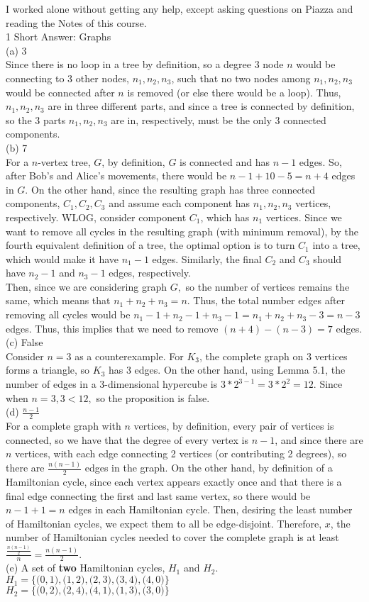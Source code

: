 \documentclass{article}
\begin{document}
I worked alone without getting any help, except asking questions on Piazza and reading the Notes of this course. \\[1cm]
{\Large 1 Short Answer: Graphs} \\[.5cm]
(a) 3 \\[.3cm]
\indent Since there is no loop in a tree by definition, so a degree 3 node $n$ would be connecting to 3 other nodes, $n_1, n_2, n_3$, such that no two nodes among $n_1, n_2, n_3$ would be connected after $n$ is removed (or else there would be a loop). Thus, $n_1, n_2, n_3$ are in three different parts, and since a tree is connected by definition, so the 3 parts $n_1, n_2, n_3$ are in, respectively, must be the only 3 connected components. \\[.5cm]
(b) 7 \\[.3cm]
\indent For a $n$-vertex tree, $G$, by definition, $G$ is connected and has $n - 1$ edges. So, after Bob's and Alice's movements, there would be $n - 1 + 10 - 5 = n + 4$ edges in $G.$ On the other hand, since the resulting graph has three connected components, $C_1, C_2, C_3$ and assume each component has $n_1, n_2, n_3$ vertices, respectively. WLOG, consider component $C_1$, which has $n_1$ vertices. Since we want to remove all cycles in the resulting graph (with minimum removal), by the fourth equivalent definition of a tree, the optimal option is to turn $C_1$ into a tree, which would make it have $n_1 - 1$ edges. Similarly, the final $C_2$ and $C_3$ should have $n_2 - 1$ and $n_3 - 1$ edges, respectively. \\[.3cm]
\indent Then, since we are considering graph $G,$ so the number of vertices remains the same, which means that $n_1 + n_2 + n_3 = n.$ Thus, the total number edges after removing all cycles would be $n_1 - 1 + n_2 - 1 + n_3 - 1 = n_1 + n_2 + n_3 - 3 = n - 3$ edges. Thus, this implies that we need to remove $(n + 4) - (n - 3) = 7$ edges.
\\[.5cm]
(c) False \\[.3cm]
\indent Consider $n = 3$ as a counterexample. For $K_3$, the complete graph on 3 vertices forms a triangle, so $K_3$ has 3 edges. On the other hand, using Lemma 5.1, the number of edges in a 3-dimensional hypercube is $3 * 2^{3-1} = 3 * 2^2 = 12.$ Since when $n = 3, 3 < 12,$ so the proposition is false. \\[.5cm]
(d) $\frac{n - 1}{2}$ \\[.3cm]
\indent For a complete graph with $n$ vertices, by definition, every pair of vertices is connected, so we have that the degree of every vertex is $n - 1$, and since there are $n$ vertices, with each edge connecting 2 vertices (or contributing 2 degrees), so there are $\frac{n(n - 1)}{2}$ edges in the graph. On the other hand, by definition of a Hamiltonian cycle, since each vertex appears exactly once and that there is a final edge connecting the first and last same vertex, so there would be $n - 1 + 1 = n$ edges in each Hamiltonian cycle. Then, desiring the least number of Hamiltonian cycles, we expect them to all be edge-disjoint. Therefore, $x$, the number of Hamiltonian cycles needed to cover the complete graph is at least $\frac{\frac{n(n - 1)}{2}}{n} = \frac{n(n - 1)}{2}.$ \\[.5cm]
(e) A set of \textbf{two} Hamiltonian cycles, $H_1$ and $H_2.$ \\[.3cm]
\indent $H_1 = \Big\{ \big(0, 1\big), \big(1, 2\big), \big(2, 3\big), \big(3, 4\big), \big(4, 0\big) \Big\}$ \\[.3cm]
\indent $H_2 = \Big\{ \big(0, 2\big), \big(2, 4\big), \big(4, 1\big), \big(1, 3\big), \big(3, 0\big) \Big\}$
\end{document}
